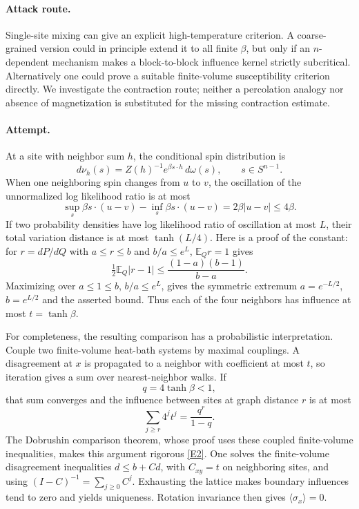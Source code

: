 \documentclass[11pt,a4paper]{article}
\newcommand{\E}{\mathbb{E}}
\newcommand{\eref}[2]{\hyperlink{extra:#1:#2}{[E#2]}}
\numberwithin{equation}{section}
\begin{document}
\paragraph{Attack route.}
Single-site mixing can give an explicit high-temperature criterion. A coarse-grained version could in principle extend it to all finite $\beta$, but only if an $n$-dependent mechanism makes a block-to-block influence kernel strictly subcritical. Alternatively one could prove a suitable finite-volume susceptibility criterion directly. We investigate the contraction route; neither a percolation analogy nor absence of magnetization is substituted for the missing contraction estimate.

\paragraph{Attempt.}
At a site with neighbor sum $h$, the conditional spin distribution is
\[
 d\nu_h(s)=Z(h)^{-1}e^{\beta s\cdot h}\,d\omega(s),\qquad s\in S^{n-1}.
\]
When one neighboring spin changes from $u$ to $v$, the oscillation of the unnormalized log likelihood ratio is at most
\[
 \sup_s\beta s\cdot(u-v)-\inf_s\beta s\cdot(u-v)
 =2\beta|u-v|\le4\beta.
\]
If two probability densities have log likelihood ratio of oscillation at most $L$, their total variation distance is at most $\tanh(L/4)$. Here is a proof of the constant: for $r=dP/dQ$ with $a\le r\le b$ and $b/a\le e^L$, $\E_Qr=1$ gives
\[
 \tfrac12\E_Q|r-1|\le\frac{(1-a)(b-1)}{b-a}.
\]
Maximizing over $a\le1\le b$, $b/a\le e^L$, gives the symmetric extremum $a=e^{-L/2}$, $b=e^{L/2}$ and the asserted bound. Thus each of the four neighbors has influence at most $t=\tanh\beta$.

For completeness, the resulting comparison has a probabilistic interpretation. Couple two finite-volume heat-bath systems by maximal couplings. A disagreement at $x$ is propagated to a neighbor with coefficient at most $t$, so iteration gives a sum over nearest-neighbor walks. If
\begin{equation}\label{eq187:smallbeta}
 q=4\tanh\beta<1,
\end{equation}
that sum converges and the influence between sites at graph distance $r$ is at most
\[
 \sum_{j\ge r}4^jt^j=\frac{q^r}{1-q}.
\]
The Dobrushin comparison theorem, whose proof uses these coupled finite-volume inequalities, makes this argument rigorous \eref{statement}{2}. One solves the finite-volume disagreement inequalities $d\le b+Cd$, with $C_{xy}=t$ on neighboring sites, and using $(I-C)^{-1}=\sum_{j\ge0}C^j$. Exhausting the lattice makes boundary influences tend to zero and yields uniqueness. Rotation invariance then gives $\langle\sigma_x\rangle=0$.
\end{document}
